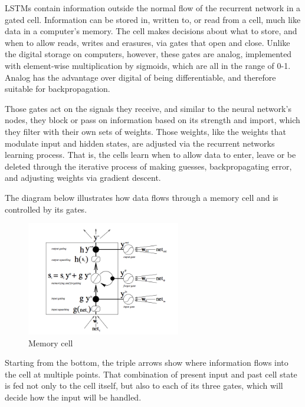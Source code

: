 {LSTMs contain information outside the normal flow of the recurrent network in a gated cell. Information can be stored in, written to, or read from a cell, much like data in a computer’s memory. The cell makes decisions about what to store, and when to allow reads, writes and erasures, via gates that open and close. Unlike the digital storage on computers, however, these gates are analog, implemented with element-wise multiplication by sigmoids, which are all in the range of 0-1. Analog has the advantage over digital of being differentiable, and therefore suitable for backpropagation.

Those gates act on the signals they receive, and similar to the neural network’s nodes, they block or pass on information based on its strength and import, which they filter with their own sets of weights. Those weights, like the weights that modulate input and hidden states, are adjusted via the recurrent networks learning process. That is, the cells learn when to allow data to enter, leave or be deleted through the iterative process of making guesses, backpropagating error, and adjusting weights via gradient descent.

The diagram below illustrates how data flows through a memory cell and is controlled by its gates.

\renewcommand{\figurename}{Abb.}
\begin{figure}[htp]
\centering
\includegraphics[width=0.60\textwidth]{pictures/gers_lstm.png}
\caption[Memory Cell]{Memory cell\protect\footnotemark}
\end{figure}

Starting from the bottom, the triple arrows show where information flows into the cell at multiple points. That combination of present input and past cell state is fed not only to the cell itself, but also to each of its three gates, which will decide how the input will be handled.

}
